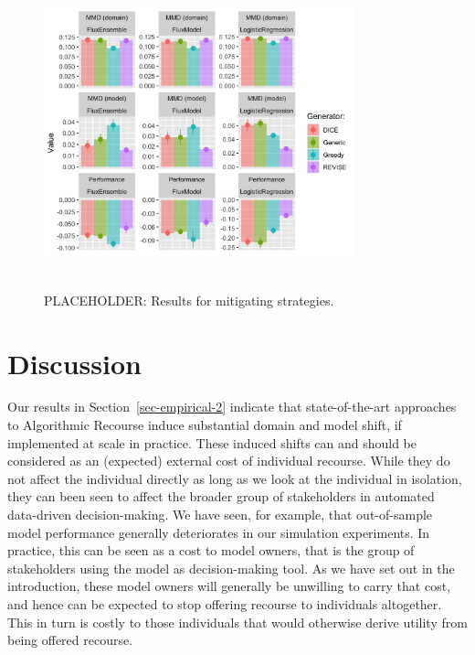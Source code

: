 \documentclass[
  conference]{IEEEtran}
\begin{document}
\begin{figure}

{\centering \includegraphics[width=9cm,height=9cm]{www/synthetic_results.png}

}

\caption{\label{fig-mitigate-results}PLACEHOLDER: Results for mitigating
strategies.}

\end{figure}

\hypertarget{sec-discussion}{%
\section{Discussion}\label{sec-discussion}}

Our results in Section~\ref{sec-empirical-2} indicate that
state-of-the-art approaches to Algorithmic Recourse induce substantial
domain and model shift, if implemented at scale in practice. These
induced shifts can and should be considered as an (expected) external
cost of individual recourse. While they do not affect the individual
directly as long as we look at the individual in isolation, they can
been seen to affect the broader group of stakeholders in automated
data-driven decision-making. We have seen, for example, that
out-of-sample model performance generally deteriorates in our simulation
experiments. In practice, this can be seen as a cost to model owners,
that is the group of stakeholders using the model as decision-making
tool. As we have set out in the introduction, these model owners will
generally be unwilling to carry that cost, and hence can be expected to
stop offering recourse to individuals altogether. This in turn is costly
to those individuals that would otherwise derive utility from being
offered recourse.
\end{document}
